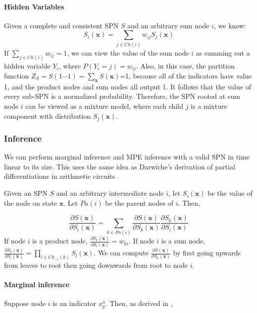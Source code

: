 \documentclass[11pt, titlepage]{article}
\theoremstyle{definition}
\newcommand\mb{\mathbf}
\begin{document}
\paragraph{Hidden Variables}
Given a complete and consistent SPN $S$ and an arbitrary sum node $i$, we know:
\begin{equation}
S_i(\mb{x})=\sum_{j\in Ch(i)}w_{ij}S_j(\mb{x})
\end{equation}
If $\sum_{j\in Ch(i)}w_{ij}=1$, we can view the value of the sum node $i$ as summing out a hidden variable $Y_i$, where $P(Y_i=j)=w_{ij}$. Also, in this case, the partition function $Z_S=S(1\cdots1)=\sum_{\mb{x}}S(\mb{x})$=1, because all of the indicators have value 1, and the product nodes and sum nodes all output 1. It follows that the value of every sub-SPN is a normalized probability. Therefore, the SPN rooted at sum node $i$ can be viewed as a mixture model, where each child $j$ is a mixture component with distribution $S_j(\mb{x})$.

\subsubsection{Inference}\label{inf}
We can perform marginal inference and MPE inference with a valid SPN in time linear to its size. This uses the same idea as Darwiche's derivation of partial differentiations in arithmetic circuits \cite{darwiche2003differential}.

Given an SPN $S$ and an arbitrary intermediate node $i$, let $S_i(\mb{x})$ be the value of the node on state $\mb{x}$. Let $Pa(i)$ be the parent nodes of $i$. Then,

\begin{equation}
\label{psx}
    \frac{\partial S(\mb{x})}{\partial S_i(\mb{x})}= \sum_{k\in Pa(i)}\frac{\partial S(\mb{x})}{\partial S_k(\mb{x})} \frac{\partial S_k(\mb{x})}{\partial S_i(\mb{x})}
\end{equation}
If node $i$ is a product node, $\frac{\partial S_k(\mb{x})}{\partial S_i(\mb{x})}=w_{ki}$. If node $i$ is a sum node, $\frac{\partial S_k(\mb{x})}{\partial S_i(\mb{x})}=\prod_{l\in Ch_{-i}(k)}S_l(\mb{x})$. We can compute $\frac{\partial S(\mb{x})}{\partial S_k(\mb{x})}$ by first going upwards from leaves to root then going downwards from root to node $i$. 

\paragraph{Marginal inference}\label{if:mg}
Suppose node $i$ is an indicator $x_p^a$. Then, as derived in \cite{darwiche2003differential},
\end{document}
